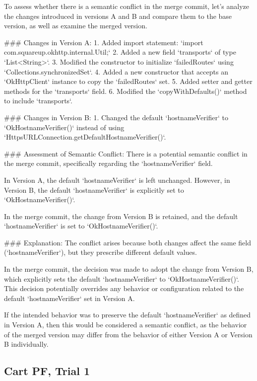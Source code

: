 \begin{response}
  To assess whether there is a semantic conflict in the merge commit, let's analyze the changes introduced in versions A and B and compare them to the base version, as well as examine the merged version.

  ### Changes in Version A:
  1. Added import statement: `import com.squareup.okhttp.internal.Util;`
  2. Added a new field `transports` of type `List<String>`.
  3. Modified the constructor to initialize `failedRoutes` using `Collections.synchronizedSet`.
  4. Added a new constructor that accepts an `OkHttpClient` instance to copy the `failedRoutes` set.
  5. Added setter and getter methods for the `transports` field.
  6. Modified the `copyWithDefaults()` method to include `transports`.
  
  ### Changes in Version B:
  1. Changed the default `hostnameVerifier` to `OkHostnameVerifier()` instead of using `HttpsURLConnection.getDefaultHostnameVerifier()`.
  
  ### Assessment of Semantic Conflict:
  There is a potential semantic conflict in the merge commit, specifically regarding the `hostnameVerifier` field.
  
  In Version A, the default `hostnameVerifier` is left unchanged. However, in Version B, the default `hostnameVerifier` is explicitly set to `OkHostnameVerifier()`.
  
  In the merge commit, the change from Version B is retained, and the default `hostnameVerifier` is set to `OkHostnameVerifier()`.
  
  ### Explanation:
  The conflict arises because both changes affect the same field (`hostnameVerifier`), but they prescribe different default values.
  
  In the merge commit, the decision was made to adopt the change from Version B, which explicitly sets the default `hostnameVerifier` to `OkHostnameVerifier()`. This decision potentially overrides any behavior or configuration related to the default `hostnameVerifier` set in Version A.
  
  If the intended behavior was to preserve the default `hostnameVerifier` as defined in Version A, then this would be considered a semantic conflict, as the behavior of the merged version may differ from the behavior of either Version A or Version B individually.
\end{response}

\subsection{Cart PF, Trial 1}

